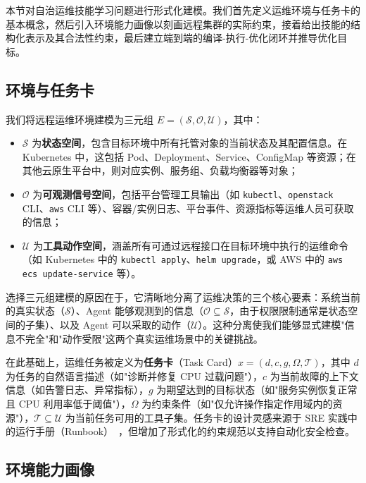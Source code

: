 \documentclass[11pt,a4paper]{ctexart}
\begin{document}
本节对自治运维技能学习问题进行形式化建模。我们首先定义运维环境与任务卡的基本概念，然后引入环境能力画像以刻画远程集群的实际约束，接着给出技能的结构化表示及其合法性约束，最后建立端到端的编译-执行-优化闭环并推导优化目标。

\subsection{环境与任务卡}

我们将远程运维环境建模为三元组 $E=(\mathcal{S}, \mathcal{O}, \mathcal{U})$，其中：
\begin{itemize}[leftmargin=2em]
  \item $\mathcal{S}$ 为\textbf{状态空间}，包含目标环境中所有托管对象的当前状态及其配置信息。在 Kubernetes 中，这包括 Pod、Deployment、Service、ConfigMap 等资源；在其他云原生平台中，则对应实例、服务组、负载均衡器等对象；
  \item $\mathcal{O}$ 为\textbf{可观测信号空间}，包括平台管理工具输出（如 \texttt{kubectl}、\texttt{openstack} CLI、\texttt{aws} CLI 等）、容器/实例日志、平台事件、资源指标等运维人员可获取的信息；
  \item $\mathcal{U}$ 为\textbf{工具动作空间}，涵盖所有可通过远程接口在目标环境中执行的运维命令（如 Kubernetes 中的 \texttt{kubectl apply}、\texttt{helm upgrade}，或 AWS 中的 \texttt{aws ecs update-service} 等）。
\end{itemize}

\noindent 选择三元组建模的原因在于，它清晰地分离了运维决策的三个核心要素：系统当前的真实状态（$\mathcal{S}$）、Agent 能够观测到的信息（$\mathcal{O} \subseteq \mathcal{S}$，由于权限限制通常是状态空间的子集）、以及 Agent 可以采取的动作（$\mathcal{U}$）。这种分离使我们能够显式建模"信息不完全"和"动作受限"这两个真实运维场景中的关键挑战。

在此基础上，运维任务被定义为\textbf{任务卡}（Task Card）$x = (d, c, g, \Omega, \mathcal{T})$，其中 $d$ 为任务的自然语言描述（如"诊断并修复 CPU 过载问题"），$c$ 为当前故障的上下文信息（如告警日志、异常指标），$g$ 为期望达到的目标状态（如"服务实例恢复正常且 CPU 利用率低于阈值"），$\Omega$ 为约束条件（如"仅允许操作指定作用域内的资源"），$\mathcal{T} \subseteq \mathcal{U}$ 为当前任务可用的工具子集。任务卡的设计灵感来源于 SRE 实践中的运行手册（Runbook）~\cite{beyer2016sre}，但增加了形式化的约束规范以支持自动化安全检查。

\subsection{环境能力画像}
\end{document}
